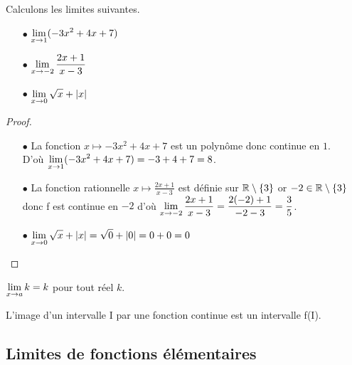 \begin{exercice} 
 Calculons les limites suivantes.
 
\begin{itemize}
\item[$  \bullet$] $ \displaystyle \lim_{x\to 1}(-3x^{2}+4x+7)$ 
 \item[$  \bullet$] $\displaystyle \lim_{x\to -2}\frac{2x+1}{x-3} $
 \item[$  \bullet$] $\displaystyle \lim_{x\to 0}\sqrt{x} +\left\lvert x \right\rvert $
  \end{itemize}

\end{exercice}




 \begin{proof}
 
\begin{itemize}
\item[$  \bullet$]  La fonction $ x\longmapsto  -3x^{2}+4x+7$ est  un polynôme donc continue en  $ 1 $.\\ D'où $ \displaystyle \lim_{x\to 1}(-3x^{2}+4x+7)= -3+4+7=8$. 
\item[$  \bullet$]  La fonction  rationnelle $ x\longmapsto \frac{2x+1}{x-3}  $ est  définie sur $ \mathbb{R}\setminus\left\{3\right\} $   or    $ -2\in \mathbb{R}\setminus\left\{3\right\} $ donc f est continue en $ -2 $  \;  d'où \;  $\displaystyle \lim_{x\to -2}\frac{2x+1}{x-3}=\frac{2(-2)+1}{-2-3}  =\frac{3}{5}$.
\item[$  \bullet$] $\displaystyle \lim_{x\to 0}\sqrt{x} +\left\lvert x \right\rvert=\sqrt{0}+\left\lvert 0 \right\rvert=0+0=0 $
     
\end{itemize}

\end{proof}
 \begin{remark}

$\displaystyle \lim_{x\to a}k=k $  pour tout réel $ k. $
\end{remark}
  
\begin{property}
L'image d'un intervalle I par une fonction continue est un
intervalle f(I).

\end{property}

\subsection*{Limites de fonctions élémentaires}
\medskip


